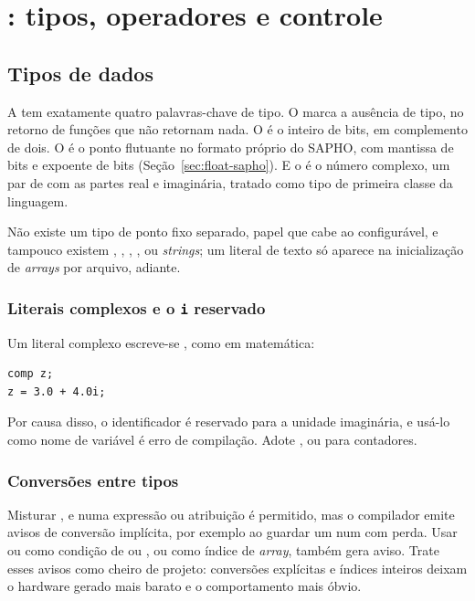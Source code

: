 \chapter{\cmm{}: tipos, operadores e controle}
\label{cap:cmm-tipos-operadores}

\section{Tipos de dados}

A \cmm{} tem exatamente quatro palavras-chave de tipo. O  marca a ausência de tipo, no retorno de funções que não retornam nada. O  é o inteiro de  bits, em complemento de dois. O  é o ponto flutuante no formato próprio do SAPHO, com mantissa de  bits e expoente de  bits (Seção~\ref{sec:float-sapho}). E o  é o número complexo, um par de  com as partes real e imaginária, tratado como tipo de primeira classe da linguagem.

Não existe um tipo de ponto fixo separado, papel que cabe ao  configurável, e tampouco existem , , , ,  ou \textit{strings}; um literal de texto só aparece na inicialização de \textit{arrays} por arquivo, adiante.

\subsection{Literais complexos e o \texttt{i} reservado}

Um literal complexo escreve-se , como em matemática:

\begin{lstlisting}[style=cmm]
comp z;
z = 3.0 + 4.0i;
\end{lstlisting}

Por causa disso, o identificador  é reservado para a unidade imaginária, e usá-lo como nome de variável é erro de compilação. Adote ,  ou  para contadores.

\subsection{Conversões entre tipos}

Misturar ,  e  numa expressão ou atribuição é permitido, mas o compilador emite avisos de conversão implícita, por exemplo ao guardar um  num  com perda. Usar  ou  como condição de  ou , ou como índice de \textit{array}, também gera aviso. Trate esses avisos como cheiro de projeto: conversões explícitas e índices inteiros deixam o hardware gerado mais barato e o comportamento mais óbvio.

